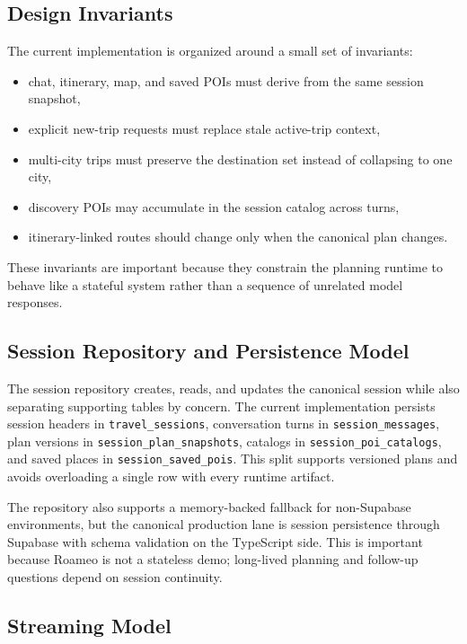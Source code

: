 \documentclass[conference]{IEEEtran}
\begin{document}
\subsection{Design Invariants}

The current implementation is organized around a small set of invariants:

\begin{itemize}
  \item chat, itinerary, map, and saved POIs must derive from the same session snapshot,
  \item explicit new-trip requests must replace stale active-trip context,
  \item multi-city trips must preserve the destination set instead of collapsing to one city,
  \item discovery POIs may accumulate in the session catalog across turns,
  \item itinerary-linked routes should change only when the canonical plan changes.
\end{itemize}

These invariants are important because they constrain the planning runtime to behave like a stateful system rather than a sequence of unrelated model responses.

\subsection{Session Repository and Persistence Model}

The session repository creates, reads, and updates the canonical session while also separating supporting tables by concern. The current implementation persists session headers in \texttt{travel\_sessions}, conversation turns in \texttt{session\_messages}, plan versions in \texttt{session\_plan\_snapshots}, catalogs in \texttt{session\_poi\_catalogs}, and saved places in \texttt{session\_saved\_pois}. This split supports versioned plans and avoids overloading a single row with every runtime artifact.

The repository also supports a memory-backed fallback for non-Supabase environments, but the canonical production lane is session persistence through Supabase with schema validation on the TypeScript side. This is important because Roameo is not a stateless demo; long-lived planning and follow-up questions depend on session continuity.

\subsection{Streaming Model}
\end{document}
